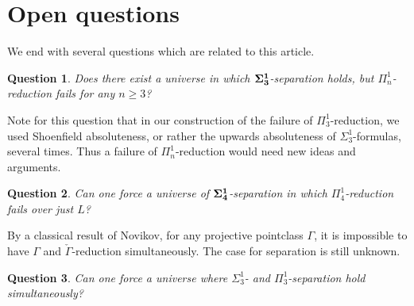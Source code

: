 \documentclass[a4paper,11pt]{article}
\newtheorem{question}{Question}
\begin{document}
\section{Open questions}
We end with several questions which are related to this article.
\begin{question}
Does there exist a universe in which $\bf{\Sigma}^1_3$-separation holds, but $\Pi^1_n$-reduction fails for any $n \ge 3$?
\end{question}
Note for this question that in our construction of the failure of $\Pi^1_3$-reduction, we used Shoenfield absoluteness, or rather the upwards absoluteness of $\Sigma^1_3$-formulas, several times. Thus a failure of $\Pi^1_n$-reduction would need new ideas and arguments.

\begin{question}
Can one force a universe of $\bf{\Sigma}^1_4$-separation in which $\Pi^1_4$-reduction fails over just $L$?
\end{question}

By a classical result of Novikov, for any projective pointclass $\Gamma$, it is impossible to have $\Gamma$ and $\check{\Gamma}$-reduction simultaneously. The case  for separation is still unknown.
\begin{question}
Can one force a universe where $\Sigma^1_3$- and $\Pi^1_3$-separation hold simultaneously?
\end{question}


 

\end{document}
